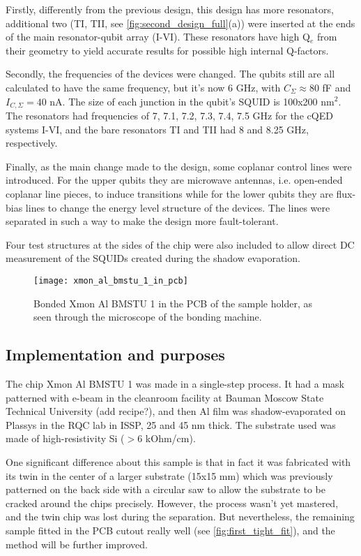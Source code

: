 Firstly, differently from the previous design, this design has more resonators, additional two (TI, TII, see \autoref{fig:second_design_full}(a)) were inserted at the ends of the main resonator-qubit array (I-VI). These resonators have high Q$_e$ from their geometry to yield accurate results for possible high internal Q-factors.

Secondly, the frequencies of the devices were changed. The qubits still are all calculated to have the same frequency, but it's now 6 GHz, with $C_\Sigma \approx 80$ fF and $I_{C, \Sigma} = 40$ nA. The size of each junction in the qubit's SQUID is 100x200 nm$^2$. The resonators had frequencies of 7, 7.1, 7.2, 7.3, 7.4, 7.5 GHz for the cQED systems I-VI, and the bare resonators TI and TII had 8 and 8.25 GHz, respectively.

Finally, as the main change made to the design, some coplanar control lines were introduced. For the upper qubits they are microwave antennas, i.e. open-ended coplanar line pieces, to induce transitions while for the lower qubits they are flux-bias lines to change the energy level structure of the devices. The lines were separated in such a way to make the design more fault-tolerant.

Four test structures at the sides of the chip were also included to allow direct DC measurement of the SQUIDs created during the shadow evaporation.


\begin{figure}
\centering
\texttt{[image: xmon\_al\_bmstu\_1\_in\_pcb]}
\caption{Bonded Xmon Al BMSTU 1 in the PCB of the sample holder, as seen through the microscope of the bonding machine.}
\label{fig:first_tight_fit}
\end{figure}

\subsection{Implementation and purposes}

The chip Xmon Al BMSTU 1 was made in a single-step process. It had a mask patterned with e-beam in the cleanroom facility at Bauman Moscow State Technical University (add recipe?), and then Al film was shadow-evaporated on Plassys in the RQC lab in ISSP, 25 and 45 nm thick. The substrate used was made of high-resistivity Si ($> 6$ kOhm/cm).

One significant difference about this sample is that in fact it was fabricated with its twin in the center of a larger substrate (15x15 mm) which was previously patterned on the back side with a circular saw to allow the substrate to be cracked around the chips precisely. However, the process wasn't yet mastered, and the twin chip was lost during the separation. But nevertheless, the remaining sample fitted in the PCB cutout really well (see \autoref{fig:first_tight_fit}), and the method will be further improved.


